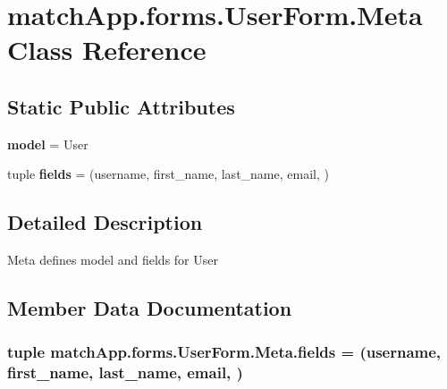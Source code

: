 \section{match\+App.\+forms.\+User\+Form.\+Meta Class Reference}
\label{classmatch_app_1_1forms_1_1_user_form_1_1_meta}
\subsection*{Static Public Attributes}
\begin{DoxyCompactItemize}
\item 
{\bf model} = User
\item 
tuple {\bf fields} = (\textquotesingle{}username\textquotesingle{}, \textquotesingle{}first\+\_\+name\textquotesingle{}, \textquotesingle{}last\+\_\+name\textquotesingle{}, \textquotesingle{}email\textquotesingle{}, \textquotesingle{})
\end{DoxyCompactItemize}


\subsection{Detailed Description}
\begin{DoxyVerb}Meta defines model and fields for User\end{DoxyVerb}
 

\subsection{Member Data Documentation}
\subsubsection[{fields}]{\setlength{\rightskip}{0pt plus 5cm}tuple match\+App.\+forms.\+User\+Form.\+Meta.\+fields = (\textquotesingle{}username\textquotesingle{}, \textquotesingle{}first\+\_\+name\textquotesingle{}, \textquotesingle{}last\+\_\+name\textquotesingle{}, \textquotesingle{}email\textquotesingle{}, \textquotesingle{})\hspace{0.3cm}{\ttfamily [static]}}\label{classmatch_app_1_1forms_1_1_user_form_1_1_meta_afe2afbc82f901ad4b2f8c4df86bc3216}
